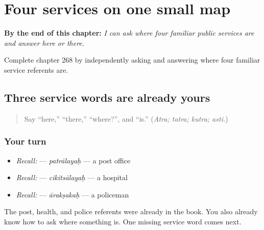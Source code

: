 
\chapter{Four services on one small map}
\label{ch:sa-service-locations}

\begin{chapteropening}
\textbf{By the end of this chapter:} \emph{I can ask where four familiar public services are and answer here or there.}

Complete chapter 268 by independently asking and answering where four familiar service referents are.
\end{chapteropening}

\section[(service-word recall)]{Three service words are already yours}

\label{lesson:SA-C268-service-recall}



\begin{quote}
Say “here,” “there,” “where?”, and “is.” (\emph{Atra; tatra; kutra; asti.})
\end{quote}

\subsection*{Your turn}
\begin{itemize}
\raggedright
  \item \emph{Recall:} \textbf{} — \emph{patrālayaḥ} — a post office
  \item \emph{Recall:} \textbf{} — \emph{cikitsālayaḥ} — a hospital
  \item \emph{Recall:} \textbf{} — \emph{ārakṣakaḥ} — a policeman
\end{itemize}

\begin{grammarlens}[title={What you've built}]
The post, health, and police referents were already in the book. You also already know how to ask where something is. One missing service word comes next.
\end{grammarlens}

